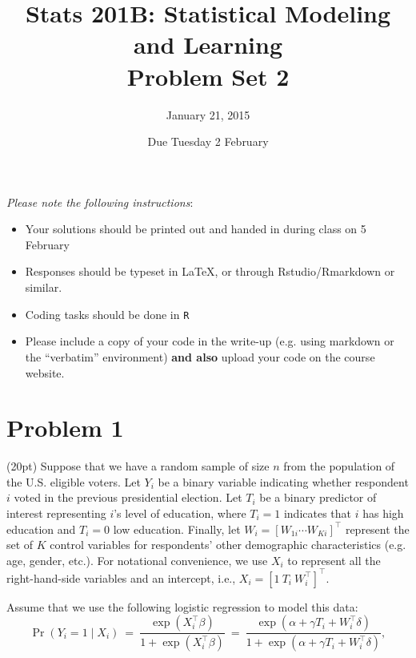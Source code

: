 \documentclass[11pt,english]{article}
\begin{document}
\title{\textbf{Stats 201B: Statistical Modeling and Learning}\\
\textbf{Problem Set 2}}
\author{January 21, 2015}

\date{Due Tuesday 2 February}
\maketitle

\textit{Please note the following instructions}:
\begin{itemize}
\item Your solutions should be printed out and handed in during class on 5 February
\item Responses should be typeset in \LaTeX, or through Rstudio/Rmarkdown or similar.
\item Coding tasks should be done in \texttt{R}
\item Please include a copy of your code in the write-up (e.g. using markdown or the ``verbatim'' environment) {\bf and also} upload your code on the course website.
\end{itemize}

\section*{Problem 1}
(20pt) Suppose that we have a random sample of size $n$ from the population of the U.S. eligible voters. Let $Y_{i}$ be a binary variable indicating whether respondent $i$ voted in the previous presidential election. Let $T_{i}$ be a binary predictor of interest representing $i$'s level of education, where $T_{i}=1$ indicates that $i$ has high education and $T_{i}=0$ low education. Finally, let $W_{i}=[W_{1i}\cdots W_{Ki}]^{\top}$ represent the set of $K$ control variables for respondents' other
demographic characteristics (e.g. age, gender, etc.). For notational convenience, we use $X_{i}$ to represent all the right-hand-side variables and an intercept, i.e., $X_{i}=[1\ T_{i}\ W_{i}^{\top}]^{\top}$.

Assume that we use the following logistic regression to model this data:
\[
\Pr(Y_{i}=1\mid X_{i})\ =\ \frac{\exp(X_{i}^{\top}\beta)}{1+\exp(X_{i}^{\top}\beta)}\ =\ \frac{\exp(\alpha+\gamma T_{i}+W_{i}^{\top}\delta)}{1+\exp(\alpha+\gamma T_{i}+W_{i}^{\top}\delta)},
\]
\end{document}
